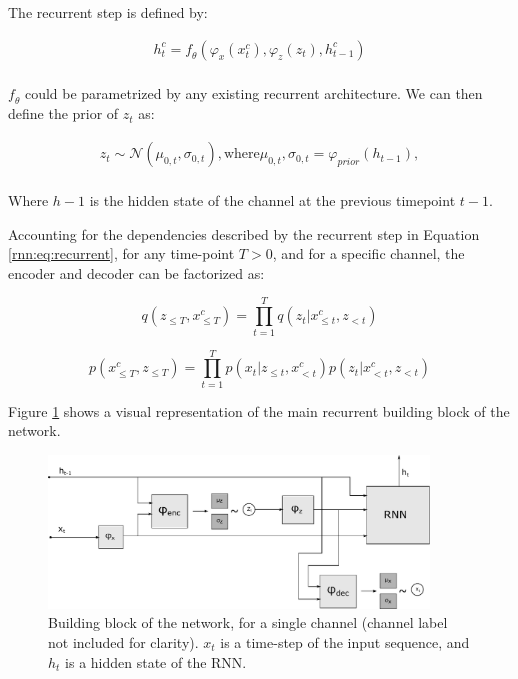 The recurrent step is defined by:

\begin{equation} 
\begin{aligned} \label{rnn:eq:recurrent}
h^c_{t} = \mathit{f}_{\theta}(\varphi_{x}(x^c_{t}), \varphi_{z}(z_t), h^c_{t-1}) \\
\end{aligned}
\end{equation}

$\mathit{f}_{\theta}$ could be parametrized by any existing recurrent architecture. We can then define the prior of $z_t$ as:

\begin{equation}
\begin{gathered} \label{rnn:eq:prior} 
z_t \sim \mathcal{N}(\mu_{0,t},\sigma_{0,t}), \text{where} \mu_{0,t},\sigma_{0,t} = \varphi_{prior} (h_{t-1}), \\
\end{gathered}
\end{equation}

Where $h-1$ is the hidden state of the channel at the previous timepoint $t-1$. 


Accounting for the dependencies described by the recurrent step in Equation \ref{rnn:eq:recurrent}, for any time-point $T>0$, and for a specific channel, the encoder and decoder can be factorized as:

\begin{equation} \label{eq:decfact}
\mathit{q}(z_{\leq T}, x^c_{\leq T}) = \prod^T_{t=1} \mathit{q}(z_t | x^c_{\leq t}, z_{<t})
\end{equation}

\begin{equation} \label{eq:encfact}
    \mathit{p}(x^c_{\leq T}, z_{\leq T}) = \prod^T_{t=1} \mathit{p}(x_t | z_{\leq t}, x^c_{<t})\mathit{p}(z_t | x^c_{<t}, z_{<t})
\end{equation}

Figure \ref{fig:rnn} shows a visual representation of the main recurrent building block of the network.

\begin{figure}[!htbp]
  \centering
    \includegraphics[width=0.9\textwidth]{figures/rnnvae/Fig1.pdf}
  \caption{Building block of the network, for a single channel (channel label not included for clarity). $x_t$ is a time-step of the input sequence, and $h_t$ is a hidden state of the RNN. }\label{fig:rnn}
\end{figure}

